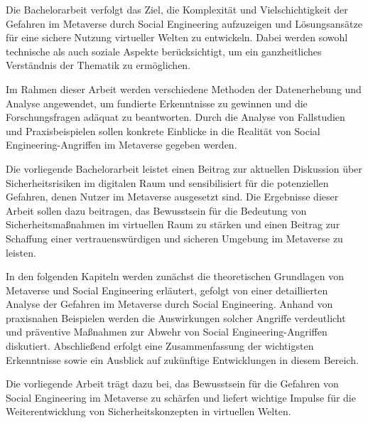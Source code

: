 Die Bachelorarbeit verfolgt das Ziel, die Komplexität und Vielschichtigkeit der Gefahren im Metaverse durch Social Engineering aufzuzeigen und Lösungsansätze für eine sichere Nutzung virtueller Welten zu entwickeln. Dabei werden sowohl technische als auch soziale Aspekte berücksichtigt, um ein ganzheitliches Verständnis der Thematik zu ermöglichen.

Im Rahmen dieser Arbeit werden verschiedene Methoden der Datenerhebung und Analyse angewendet, um fundierte Erkenntnisse zu gewinnen und die Forschungsfragen adäquat zu beantworten. Durch die Analyse von Fallstudien und Praxisbeispielen sollen konkrete Einblicke in die Realität von Social Engineering-Angriffen im Metaverse gegeben werden.

Die vorliegende Bachelorarbeit leistet einen Beitrag zur aktuellen Diskussion über Sicherheitsrisiken im digitalen Raum und sensibilisiert für die potenziellen Gefahren, denen Nutzer im Metaverse ausgesetzt sind. Die Ergebnisse dieser Arbeit sollen dazu beitragen, das Bewusstsein für die Bedeutung von Sicherheitsmaßnahmen im virtuellen Raum zu stärken und einen Beitrag zur Schaffung einer vertrauenswürdigen und sicheren Umgebung im Metaverse zu leisten.

In den folgenden Kapiteln werden zunächst die theoretischen Grundlagen von Metaverse und Social Engineering erläutert, gefolgt von einer detaillierten Analyse der Gefahren im Metaverse durch Social Engineering. Anhand von praxisnahen Beispielen werden die Auswirkungen solcher Angriffe verdeutlicht und präventive Maßnahmen zur Abwehr von Social Engineering-Angriffen diskutiert. Abschließend erfolgt eine Zusammenfassung der wichtigsten Erkenntnisse sowie ein Ausblick auf zukünftige Entwicklungen in diesem Bereich.

Die vorliegende Arbeit trägt dazu bei, das Bewusstsein für die Gefahren von Social Engineering im Metaverse zu schärfen und liefert wichtige Impulse für die Weiterentwicklung von Sicherheitskonzepten in virtuellen Welten.

